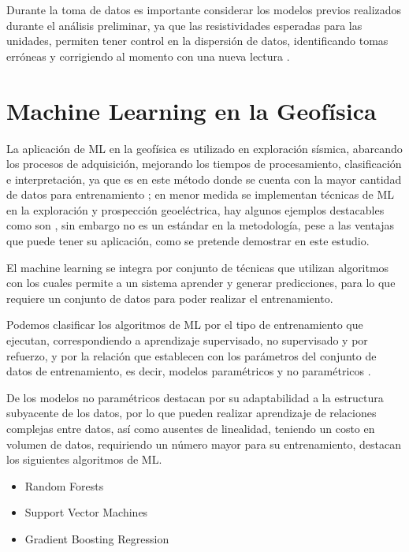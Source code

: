 			Durante la toma de datos es importante considerar los modelos previos realizados durante el análisis preliminar, ya que las resistividades esperadas para las unidades, permiten tener control en la dispersión de datos, identificando tomas erróneas y corrigiendo al momento con una nueva lectura \citep{telford1990}.
	
	\section{Machine Learning en la Geofísica}  
	
	La aplicación de ML en la geofísica es utilizado en exploración sísmica, abarcando los procesos de adquisición, mejorando los tiempos de procesamiento, clasificación e interpretación, ya que es en este método donde se cuenta con la mayor cantidad de datos para entrenamiento \citep{wrona2018}; en menor medida se implementan técnicas de ML en la exploración y prospección geoeléctrica, hay algunos ejemplos destacables como son \cite{liu2020, el2001, li2024}, sin embargo no es un estándar en la metodología, pese a las ventajas que puede tener su aplicación, como se pretende demostrar en este estudio.
		
	El machine learning se integra por conjunto de técnicas que utilizan algoritmos con los cuales permite a un sistema aprender y generar predicciones, para lo que requiere un conjunto de datos para poder realizar el entrenamiento.
	
	Podemos clasificar los algoritmos de ML por el tipo de entrenamiento que ejecutan, correspondiendo a aprendizaje supervisado, no supervisado y por refuerzo, y por la relación que establecen con los parámetros del conjunto de datos de entrenamiento, es decir, modelos paramétricos y no paramétricos \citep{li2024}. 
	
	De los modelos no paramétricos destacan por su adaptabilidad a la estructura subyacente de los datos, por lo que pueden realizar aprendizaje de relaciones complejas entre datos, así como ausentes de linealidad, teniendo un costo en volumen de datos, requiriendo un número mayor para su entrenamiento, destacan los siguientes algoritmos de ML.
	
	\begin{itemize}
		\item Random Forests
		\item Support Vector Machines 
		\item Gradient Boosting Regression
	\end{itemize}
	
